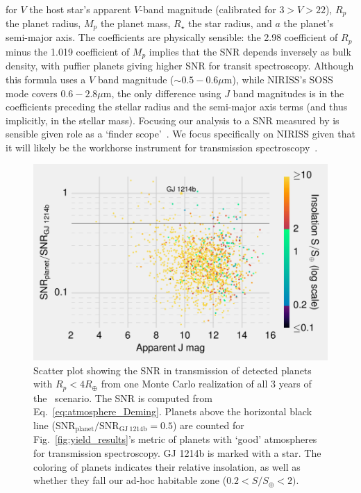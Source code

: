 \begin{enumerate}
\begin{align*}
	\end{align*}
	for $V$ the host star's apparent $V$-band magnitude (calibrated for $3>V>22$), $R_p$ the planet radius, $M_p$ the planet mass, $R_\star$ the star radius, and $a$ the planet's semi-major axis.
	The coefficients are physically sensible: the 2.98 coefficient of $R_p$ minus the 1.019 coefficient of $M_p$ implies that the SNR depends inversely as bulk density, with puffier planets giving higher SNR for transit spectroscopy.
	Although this formula uses a $V$ band magnitude ($\sim 0.5-0.6\mu\mathrm{m}$), while NIRISS's SOSS mode covers $0.6-2.8\mu\mathrm{m}$, the only difference using $J$ band magnitudes is in the coefficients preceding the stellar radius and the semi-major axis terms (and thus implicitly, in the stellar mass).
	Focusing our analysis to a SNR measured by \jwst is sensible given \tesss role as a `\jwst finder scope'~\citep{deming_jwst_tess_2009}.
	We focus specifically on NIRISS given that it will likely be the workhorse \jwst instrument for transmission spectroscopy~\citep{beichman_observations_2014}.
	\begin{figure}[!th]
		\centering
		\includegraphics[]{figures/SNR_in_transmission.pdf}
		\caption{ Scatter plot showing the SNR in transmission of detected planets with $R_p<4R_\oplus$ from one Monte Carlo realization of all 3 years of the \nhemi\ scenario.
			The SNR is computed from Eq.~\protect\ref{eq:atmosphere_Deming}.
			Planets above the horizontal black line ($\mathrm{SNR_{planet}/SNR_{GJ\ 1214b}} = 0.5$) are counted for Fig.~\protect\ref{fig:yield_results}'s metric of planets with `good' atmospheres for transmission spectroscopy.
			GJ 1214b is marked with a star.
			The coloring of planets indicates their relative insolation, as well as whether they fall our ad-hoc habitable zone ($0.2<S/S_\oplus<2)$.
		}
		\label{fig:atmosphere_scatter}
	\end{figure}


\end{enumerate}
